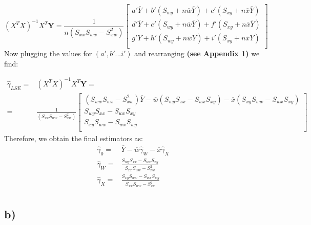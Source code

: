 \documentclass[a4paper]{article}
\begin{document}
\begin{equation*}
(X^{T}X)^{-1}X^{T}\textbf{Y} = 
	\frac{1}{n(S_{xx}S_{ww}-S_{xw}^2)}
	\begin{bmatrix}
	a'\overline{Y} + b'(S_{wy} + n\overline{w}\overline{Y}) + c'(S_{xy} + n\overline{x}\overline{Y}) \\
	d'\overline{Y} + e'(S_{wy} + n\overline{w}\overline{Y}) + f'(S_{xy} + n\overline{x}\overline{Y}) \\
	g'\overline{Y} + h'(S_{wy} + n\overline{w}\overline{Y}) + i'(S_{xy} + n\overline{x}\overline{Y}) \\
	\end{bmatrix} 
\end{equation*}
Now plugging the values for $(a', b' ... i')$ and rearranging \textbf{(see Appendix 1)} we find:

\begin{equation*}
\begin{split}
\hat{\gamma}_{LSE} = & (X^{T}X)^{-1}X^{T}\textbf{Y} = \\
	= & \frac{1}{(S_{xx}S_{ww}-S_{xw}^2)}
	\begin{bmatrix}
	(S_{ww}S_{wx}-S_{xw}^2)\overline{Y} - \overline{w}(S_{wy}S_{xx} - S_{wx}S_{xy}) - \overline{x}(S_{xy}S_{ww} - S_{wx}S_{xy}) \\
	S_{wy}S_{xx} - S_{wx}S_{xy} \\
	S_{xy}S_{ww} - S_{wx}S_{wy} \\
	\end{bmatrix} 
\end{split}
\end{equation*}
Therefore, we obtain the final estimators as:
\begin{equation*}
\begin{split}
	\hat{\gamma}_{0} = & \overline{Y} - \overline{w}\hat{\gamma}_{W} - \overline{x}\hat{\gamma}_{X} \\
	\hat{\gamma}_{W} = & \frac{S_{wy}S_{xx} - S_{wx}S_{xy}}{S_{xx}S_{ww}-S_{xw}^2} \\
	\hat{\gamma}_{X} = & \frac{S_{xy}S_{ww} - S_{wx}S_{wy}}{S_{xx}S_{ww}-S_{xw}^2} \\
\end{split}
\end{equation*}

\subsection{b)}
\end{document}
